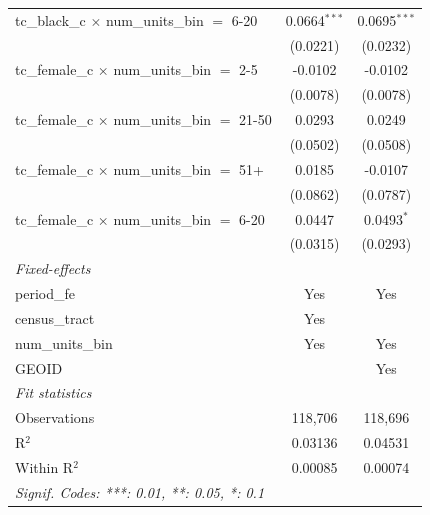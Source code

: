 \begin{tabular}{lcc}
   tc\_black\_c $\times$ num\_units\_bin $=$ 6-20        & 0.0664$^{***}$  & 0.0695$^{***}$\\   
                                                         & (0.0221)        & (0.0232)\\   
   tc\_female\_c $\times$ num\_units\_bin $=$ 2-5        & -0.0102         & -0.0102\\   
                                                         & (0.0078)        & (0.0078)\\   
   tc\_female\_c $\times$ num\_units\_bin $=$ 21-50      & 0.0293          & 0.0249\\   
                                                         & (0.0502)        & (0.0508)\\   
   tc\_female\_c $\times$ num\_units\_bin $=$ 51+        & 0.0185          & -0.0107\\   
                                                         & (0.0862)        & (0.0787)\\   
   tc\_female\_c $\times$ num\_units\_bin $=$ 6-20       & 0.0447          & 0.0493$^{*}$\\   
                                                         & (0.0315)        & (0.0293)\\   
   \midrule
   \emph{Fixed-effects}\\
   period\_fe                                            & Yes             & Yes\\  
   census\_tract                                         & Yes             & \\  
   num\_units\_bin                                       & Yes             & Yes\\  
   GEOID                                                 &                 & Yes\\  
   \midrule
   \emph{Fit statistics}\\
   Observations                                          & 118,706         & 118,696\\  
   R$^2$                                                 & 0.03136         & 0.04531\\  
   Within R$^2$                                          & 0.00085         & 0.00074\\  
   \midrule \midrule
   \multicolumn{3}{l}{\emph{Signif. Codes: ***: 0.01, **: 0.05, *: 0.1}}\\
\end{tabular}
\par\endgroup
